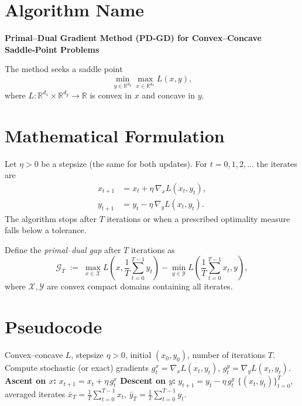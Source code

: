 \documentclass{article}
\begin{document}
\section*{Algorithm Name}
\textbf{Primal–Dual Gradient Method (PD‑GD) for Convex–Concave Saddle‑Point Problems}

The method seeks a saddle point 
\[
\min_{y\in\mathbb{R}^{d_y}}\max_{x\in\mathbb{R}^{d_x}} L(x,y),
\]
where $L:\mathbb{R}^{d_x}\times\mathbb{R}^{d_y}\rightarrow\mathbb{R}$ is convex in $x$ and concave in $y$.

\section*{Mathematical Formulation}
Let $\eta>0$ be a stepsize (the same for both updates).  
For $t=0,1,2,\dots$ the iterates are
\begin{align}
x_{t+1} &= x_t + \eta\,\nabla_x L(x_t,y_t), \label{eq:ascent}\\
y_{t+1} &= y_t - \eta\,\nabla_y L(x_t,y_t). \label{eq:descent}
\end{align}
The algorithm stops after $T$ iterations or when a prescribed optimality measure falls below a tolerance.

Define the \emph{primal–dual gap} after $T$ iterations as
\[
\mathcal{G}_T \;:=\; \max_{x\in\mathcal{X}} L\!\left(x,\frac{1}{T}\sum_{t=0}^{T-1}y_t\right)
            - \min_{y\in\mathcal{Y}} L\!\left(\frac{1}{T}\sum_{t=0}^{T-1}x_t ,y\right),
\]
where $\mathcal{X},\mathcal{Y}$ are convex compact domains containing all iterates.

\section*{Pseudocode}
\begin{algorithm}[H]
\caption{Primal–Dual Gradient Method}
\begin{algorithmic}[1]
\Require Convex--concave $L$, stepsize $\eta>0$, initial $(x_0,y_0)$, number of iterations $T$.
    \State Compute stochastic (or exact) gradients 
          $g^x_t = \nabla_x L(x_t,y_t)$,
          $g^y_t = \nabla_y L(x_t,y_t)$.
    \State \textbf{Ascent on $x$:} $x_{t+1}= x_t + \eta\, g^x_t$ 
    \State \textbf{Descent on $y$:} $y_{t+1}= y_t - \eta\, g^y_t$ 
\EndFor
\State \Return $\{(x_t,y_t)\}_{t=0}^{T}$, averaged iterates 
        $\bar x_T =\tfrac1T\sum_{t=0}^{T-1}x_t$, 
        $\bar y_T =\tfrac1T\sum_{t=0}^{T-1}y_t$.
\end{algorithmic}
\end{algorithm}
\end{document}
